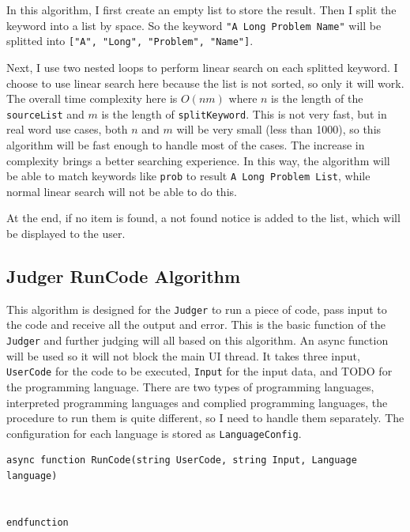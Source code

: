 \documentclass[a4paper]{report}
\begin{document}
In this algorithm, I first create an empty list to store the result. Then I split the keyword into a list by space. So the keyword \texttt{"A Long Problem Name"} will be splitted into \texttt{["A", "Long", "Problem", "Name"]}.

Next, I use two nested loops to perform linear search on each splitted keyword. I choose to use linear search here because the list is not sorted, so only it will work. The overall time complexity here is $O(nm)$ where $n$ is the length of the \texttt{sourceList} and $m$ is the length of \texttt{splitKeyword}. This is not very fast, but in real word use cases, both $n$ and $m$ will be very small (less than 1000), so this algorithm will be fast enough to handle most of the cases. The increase in complexity brings a better searching experience. In this way, the algorithm will be able to match keywords like \texttt{prob} to result \texttt{A Long Problem List}, while normal linear search will not be able to do this.

At the end, if no item is found, a not found notice is added to the list, which will be displayed to the user.

\subsection{Judger RunCode Algorithm}

This algorithm is designed for the \texttt{Judger} to run a piece of code, pass input to the code and receive all the output and error. This is the basic function of the \texttt{Judger} and further judging will all based on this algorithm. An async function will be used so it will not block the main UI thread. It takes three input, \texttt{UserCode} for the code to be executed, \texttt{Input} for the input data, and TODO for the programming language. There are two types of programming languages, interpreted programming languages and complied programming languages, the procedure to run them is quite different, so I need to handle them separately. The configuration for each language is stored as \texttt{LanguageConfig}.


\begin{verbatim}
async function RunCode(string UserCode, string Input, Language language)


endfunction
\end{verbatim}
\end{document}
